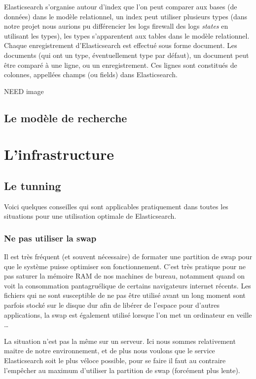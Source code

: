 Elasticsearch s'organise autour d'index que l'on peut comparer aux bases (de données)
dans le modèle relationnel, un index peut utiliser plusieurs types (dans notre projet
nous aurions pu différencier les logs firewall des logs \textit{states} en utilisant 
les types), les types s'apparentent aux tables dans le modèle relationnel. 
Chaque enregistrement d'Elasticsearch est effectué sous forme document. Les documents
(qui ont un type, éventuellement type par défaut), un document peut être comparé 
à une ligne, ou un enregistrement. Ces lignes sont constitués de colonnes, appellées
champs (ou fields) dans Elasticsearch.


{\Huge NEED image}

\subsection{Le modèle de recherche}



\section{L'infrastructure}

\subsection{Le tunning}
Voici quelques conseilles qui sont applicables pratiquement dans toutes les situations
pour une utilisation optimale de Elasticsearch.

\subsubsection{Ne pas utiliser la swap}
Il est très fréquent (et souvent nécessaire) de formater une partition de swap pour
que le système puisse optimiser son fonctionnement. C'est très pratique pour ne pas
saturer la mémoire RAM de nos machines de bureau, notamment quand on voit la consommation
pantagruélique de certains navigateurs internet récents. Les fichiers qui ne sont 
susceptible de ne pas être utilisé avant un long moment sont parfois stocké sur le
disque dur afin de libérer de l'espace pour d'autres applications, la swap est
également utilisé lorsque l'on met un ordinateur en veille \ldots

La situation n'est pas la même sur un serveur. Ici nous sommes relativement maitre
de notre environnement, et de plus nous voulons que le service Elasticsearch soit 
le plus véloce possible, pour se faire il faut au contraire l'empêcher au maximum 
d'utiliser la partition de swap (forcément plus lente).

